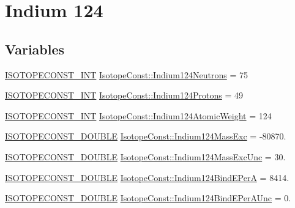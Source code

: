 \hypertarget{group___isotope_const-_indium-_in124}{}\section{Indium 124}
\label{group___isotope_const-_indium-_in124}
\subsection*{Variables}
\begin{DoxyCompactItemize}
\item 
\mbox{\hyperlink{group___isotope_const-_macros_ga5f18360b3e99483a35c32d789e62621c}{I\+S\+O\+T\+O\+P\+E\+C\+O\+N\+S\+T\+\_\+\+I\+NT}} \mbox{\hyperlink{group___isotope_const-_indium-_in124_ga79d042f4b38b91a31d4a321d740e54dc}{Isotope\+Const\+::\+Indium124\+Neutrons}} = 75
\item 
\mbox{\hyperlink{group___isotope_const-_macros_ga5f18360b3e99483a35c32d789e62621c}{I\+S\+O\+T\+O\+P\+E\+C\+O\+N\+S\+T\+\_\+\+I\+NT}} \mbox{\hyperlink{group___isotope_const-_indium-_in124_ga2fabbe7e42008bd98f57fda4f7880ef3}{Isotope\+Const\+::\+Indium124\+Protons}} = 49
\item 
\mbox{\hyperlink{group___isotope_const-_macros_ga5f18360b3e99483a35c32d789e62621c}{I\+S\+O\+T\+O\+P\+E\+C\+O\+N\+S\+T\+\_\+\+I\+NT}} \mbox{\hyperlink{group___isotope_const-_indium-_in124_gad2b954841574cabd440fb039e745ce73}{Isotope\+Const\+::\+Indium124\+Atomic\+Weight}} = 124
\item 
\mbox{\hyperlink{group___isotope_const-_macros_ga8f45a7272ce02c0b4c65c44636ed719a}{I\+S\+O\+T\+O\+P\+E\+C\+O\+N\+S\+T\+\_\+\+D\+O\+U\+B\+LE}} \mbox{\hyperlink{group___isotope_const-_indium-_in124_ga5c674718d81caccefa13a9beed98010d}{Isotope\+Const\+::\+Indium124\+Mass\+Exc}} = -\/80870.
\item 
\mbox{\hyperlink{group___isotope_const-_macros_ga8f45a7272ce02c0b4c65c44636ed719a}{I\+S\+O\+T\+O\+P\+E\+C\+O\+N\+S\+T\+\_\+\+D\+O\+U\+B\+LE}} \mbox{\hyperlink{group___isotope_const-_indium-_in124_ga725717f9a2a69c526260d8bcbc3eb637}{Isotope\+Const\+::\+Indium124\+Mass\+Exc\+Unc}} = 30.
\item 
\mbox{\hyperlink{group___isotope_const-_macros_ga8f45a7272ce02c0b4c65c44636ed719a}{I\+S\+O\+T\+O\+P\+E\+C\+O\+N\+S\+T\+\_\+\+D\+O\+U\+B\+LE}} \mbox{\hyperlink{group___isotope_const-_indium-_in124_ga511f05ce4ee0345b8927c725a96da2e2}{Isotope\+Const\+::\+Indium124\+Bind\+E\+PerA}} = 8414.
\item 
\mbox{\hyperlink{group___isotope_const-_macros_ga8f45a7272ce02c0b4c65c44636ed719a}{I\+S\+O\+T\+O\+P\+E\+C\+O\+N\+S\+T\+\_\+\+D\+O\+U\+B\+LE}} \mbox{\hyperlink{group___isotope_const-_indium-_in124_ga87d9ea6ecedc032e717579ed9a259447}{Isotope\+Const\+::\+Indium124\+Bind\+E\+Per\+A\+Unc}} = 0.

\end{DoxyCompactItemize}
